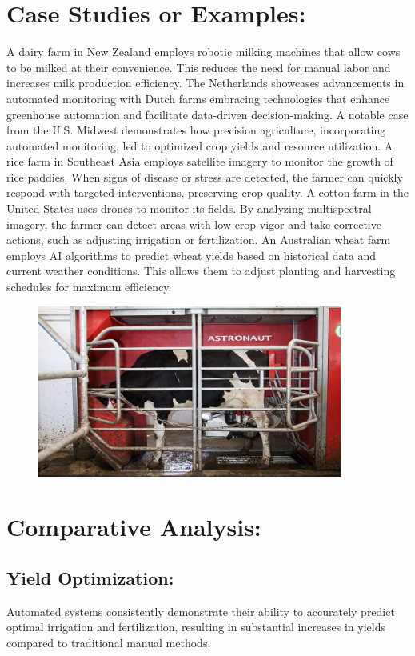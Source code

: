 \documentclass{article}
\begin{document}
\begin{enumerate}
\section{Case Studies or Examples:} A dairy farm in New Zealand employs robotic milking machines that allow cows to be milked at their convenience. This reduces the need for manual labor and increases milk production efficiency.
The Netherlands showcases advancements in automated monitoring with Dutch farms embracing technologies that enhance greenhouse automation and facilitate data-driven decision-making.
A notable case from the U.S. Midwest demonstrates how precision agriculture, incorporating automated monitoring, led to optimized crop yields and resource utilization.
A rice farm in Southeast Asia employs satellite imagery to monitor the growth of rice paddies. When signs of disease or stress are detected, the farmer can quickly respond with targeted interventions, preserving crop quality.
A cotton farm in the United States uses drones to monitor its fields. By analyzing multispectral imagery, the farmer can detect areas with low crop vigor and take corrective actions, such as adjusting irrigation or fertilization.
An Australian wheat farm employs AI algorithms to predict wheat yields based on historical data and current weather conditions. This allows them to adjust planting and harvesting schedules for maximum efficiency.
\begin{figure}[th]
    \centering
    \includegraphics[width=10cm]{1-MAIN-diary-robot-TS-2565-c-Tim-Scrivener.jpg}
     \label{fig:enter-label}
\end{figure}
\section{Comparative Analysis:}
\subsection{Yield Optimization:} 
Automated systems consistently demonstrate their ability to accurately predict optimal irrigation and fertilization, resulting in substantial increases in yields compared to traditional manual methods.

\end{enumerate}
\end{document}

